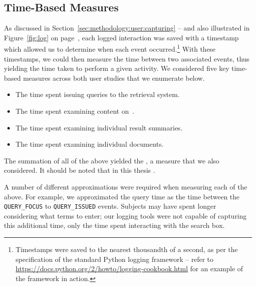 
\subsection{Time-Based Measures}\label{sec:methodology:extracting:time}
As discussed in Section~\ref{sec:methodology:user:capturing} -- and also illustrated in Figure~\ref{fig:log} on page~\pageref{fig:log}, each logged interaction was saved with a timestamp which allowed us to determine when each event occurred.\footnote{Timestamps were saved to the nearest thousandth of a second, as per the specification of the standard Python logging framework -- refer to \url{https://docs.python.org/2/howto/logging-cookbook.html}  for an example of the framework in action.} With these timestamps, we could then measure the time between two associated events, thus yielding the time taken to perform a given activity. We considered five key time-based measures across both user studies that we enumerate below.

\begin{itemize}
    \item{ The time spent issuing queries to the retrieval system.}
    \item{ The time spent examining content on~.}
    \item{ The time spent examining individual result summaries.}
    \item{ The time spent examining individual documents.}
\end{itemize}

The summation of all of the above yielded the , a measure that we also considered. It should be noted that in this thesis .

A number of different approximations were required when measuring each of the above. For example, we approximated the query time as the time between the \texttt{QUERY\_FOCUS} to \texttt{QUERY\_ISSUED} events. Subjects may have spent longer considering what terms to enter; our logging tools were not capable of capturing this additional time, only the time spent interacting with the search box.

